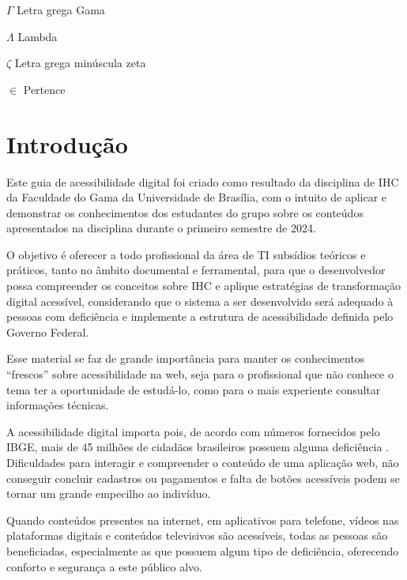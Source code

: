 \documentclass[
  12pt,
  openright,
  twoside,
  a4paper,
  english,
  french,
  spanish,
  brazil
]{abntex2}
\begin{document}
\begin{simbolos}
  \item[$ \Gamma $] Letra grega Gama
  \item[$ \Lambda $] Lambda
  \item[$ \zeta $] Letra grega minúscula zeta
  \item[$ \in $] Pertence
\end{simbolos}

\tableofcontents*
\cleardoublepage

\textual

\chapter{Introdução}

Este guia de acessibilidade digital foi criado como resultado da disciplina de
IHC da Faculdade do Gama da Universidade de Brasília, com o intuito de aplicar e
demonstrar os conhecimentos dos estudantes do grupo sobre os conteúdos
apresentados na disciplina durante o primeiro semestre de 2024.

O objetivo é oferecer a todo profissional da área de TI subsídios teóricos e
práticos, tanto no âmbito documental e ferramental, para que o desenvolvedor
possa compreender os conceitos sobre IHC e aplique estratégias de transformação
digital acessível, considerando que o sistema a ser desenvolvido será adequado à
pessoas com deficiência e implemente a estrutura de acessibilidade definida pelo
Governo Federal.

Esse material se faz de grande importância para manter os conhecimentos
``frescos'' sobre acessibilidade na web, seja para o profissional que não
conhece o tema ter a oportunidade de estudá-lo, como para o mais experiente
consultar informações técnicas.

A acessibilidade digital importa pois, de acordo com números fornecidos pelo
IBGE, mais de 45 milhões de cidadãos brasileiros possuem alguma deficiência
\cite{DAP:Guia-de-Boas-Praticas}. Dificuldades para interagir e compreender o
conteúdo de uma aplicação web, não conseguir concluir cadastros ou pagamentos e
falta de botões acessíveis podem se tornar um grande empecilho ao indivíduo.

Quando conteúdos presentes na internet, em aplicativos para telefone, vídeos nas
plataformas digitais e conteúdos televisivos são acessíveis, todas as pessoas
são beneficiadas, especialmente as que possuem algum tipo de deficiência,
oferecendo conforto e segurança a este público alvo.
\end{document}
